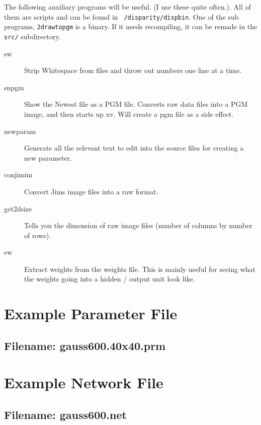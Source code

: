 \documentclass[a4paper]{article}
\begin{document}
The following auxiliary programs will be useful. (I use these quite
often.). All of them are scripts and can be found in
\texttt{~/disparity/dispbin}.  One of the sub programs,
\texttt{2drawtopgm} is a binary. If it needs recompiling, it can be
remade in the \texttt{src/} subdirectory.

\begin{description}
\item[sw] Strip Whitespace from files and throw out numbers one line
  at a time.

\item[snpgm] Show the Newest file as a PGM file. Converts raw data
  files into a PGM image, and then starts up xv.  Will create a pgm
  file as a side effect.

\item[newparam] Generate all the relevant text to edit into the source
  files for creating a new parameter.


\item[conjimim] Convert Jims image files into a raw format.

\item[get2dsize] Tells you  the dimension of raw image files (number
  of columns by number of rows).


\item[ew] Extract weights from the weights file.  This is mainly
  useful for seeing what the weights going into a hidden / output unit
  look like.

\end{description}

\clearpage
\appendix

\section{Example Parameter File} \label{egparam}

\subsection*{Filename: gauss600.40x40.prm}


\clearpage


\section{Example Network File} \label{egnet}

\subsection*{Filename: gauss600.net}

\end{document}

